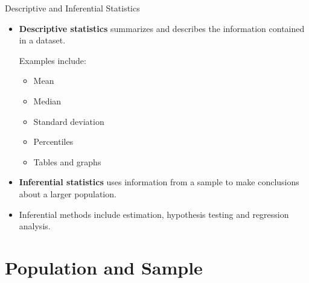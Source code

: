 \documentclass{beamer}
\begin{document}
\begin{frame}{Descriptive and Inferential Statistics}

\begin{itemize}

  \item \textbf{Descriptive statistics} summarizes and describes the information contained in a dataset.

  \vskip 0.4cm

  Examples include:

  \begin{itemize}
    \item Mean
    \item Median
    \item Standard deviation
    \item Percentiles
    \item Tables and graphs
  \end{itemize}

  \vskip 0.4cm

  \item \textbf{Inferential statistics} uses information from a sample to make conclusions about a larger population.

  \vskip 0.4cm

  \item Inferential methods include estimation, hypothesis testing and regression analysis.

\end{itemize}

\end{frame}



\section{Population and Sample}
\end{document}
